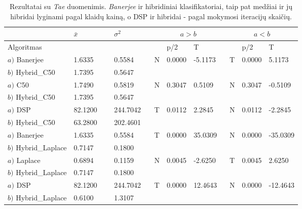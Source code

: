 \begin{table}[h]
\caption{Rezultatai su \emph{Tae} duomenimis. \emph{Banerjee} ir hibridiniai klasifikatoriai, taip pat medžiai ir jų hibridai lyginami pagal klaidų kainą, o DSP ir hibridai - pagal mokymosi iteracijų skaičių.}
{\begin{tabular}{@{}lllllllll@{}} \hline
             & $\bar{x}$ & $\sigma^{2}$& \multicolumn{3}{|c|}{$a > b$}  &  \multicolumn{3}{|c}{$a < b$} \\
\hline
Algoritmas &            &            & & p/2 & T        & & p/2 & T \\
\hline
$a)$ Banerjee & 1.6335 & 0.5584 & N & 0.0000 & -5.1173 & T & 0.0000 & 5.1173 \\
$b)$ Hybrid\_C50 & 1.7395 & 0.5647 &  &  &  &  &  & \\
\hline
$a)$ C50 & 1.7490 & 0.5819 & N & 0.3047 & 0.5109 & N & 0.3047 & -0.5109 \\
$b)$ Hybrid\_C50 & 1.7395 & 0.5647 &  &  &  &  &  & \\
\hline
$a)$ DSP & 82.1200 & 244.7042 & T & 0.0112 & 2.2845 & N & 0.0112 & -2.2845 \\
$b)$ Hybrid\_C50 & 63.2800 & 202.4601 &  &  &  &  &  & \\
\hline
\hline
$a)$ Banerjee & 1.6335 & 0.5584 & T & 0.0000 & 35.0309 & N & 0.0000 & -35.0309 \\
$b)$ Hybrid\_Laplace & 0.7147 & 0.1800 &  &  &  &  &  & \\
\hline
$a)$ Laplace & 0.6894 & 0.1159 & N & 0.0045 & -2.6250 & T & 0.0045 & 2.6250 \\
$b)$ Hybrid\_Laplace & 0.7147 & 0.1800 &  &  &  &  &  & \\
\hline
$a)$ DSP & 82.1200 & 244.7042 & T & 0.0000 & 12.4643 & N & 0.0000 & -12.4643 \\
$b)$ Hybrid\_Laplace & 0.6100 & 1.3107 &  &  &  &  &  & \\
\end{tabular}}
\label{tab:tae dataset ttests}
\end{table}
